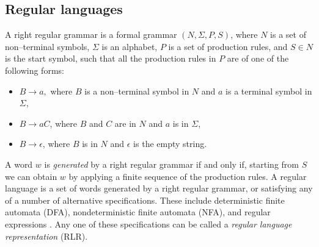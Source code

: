 \documentclass{article}
\theoremstyle{plain}
\newenvironment{snippet}{\VerbatimEnvironment\fontfamily{ppl}
\selectfont
\begin{Verbatim}}{\end{Verbatim}}
\begin{document}
%
%
%
%
%
%


\subsection{Regular languages}
A right regular grammar is a formal grammar \( (N, \Sigma, P, S) \), where
\( N \) is a set of non--terminal symbols,
\( \Sigma \) is an alphabet,
\( P \) is a set of production rules, and
\( S \in N \) is the start symbol, such that
all the production rules in \( P \) are of one of the following forms:
\begin{itemize}
  \item \( B \rightarrow a, \) where \( B \) is a non--terminal symbol in \( N
    \) and \( a \) is a terminal symbol in \( \Sigma \),
  \item \( B \rightarrow aC \), where \( B \) and \( C \) are in \( N \) and
    \( a \) is in \( \Sigma \),
  \item \( B \rightarrow \epsilon \), where \( B \) is in \( N \) and
    \( \epsilon \) is the empty string.
\end{itemize}

A word \( w \) is \emph{generated} by a right regular grammar if and only if,
starting from \( S \) we can obtain \( w \) by applying a finite sequence of
the production rules.
A regular language is a set of words generated by a right regular grammar,
or satisfying any of a number of alternative specifications.
These include deterministic finite automata (DFA), nondeterministic finite
automata (NFA), and regular expressions \cite{sipser}.
Any one of these specifications can be called a \emph{regular language
representation} (RLR).
\end{document}
